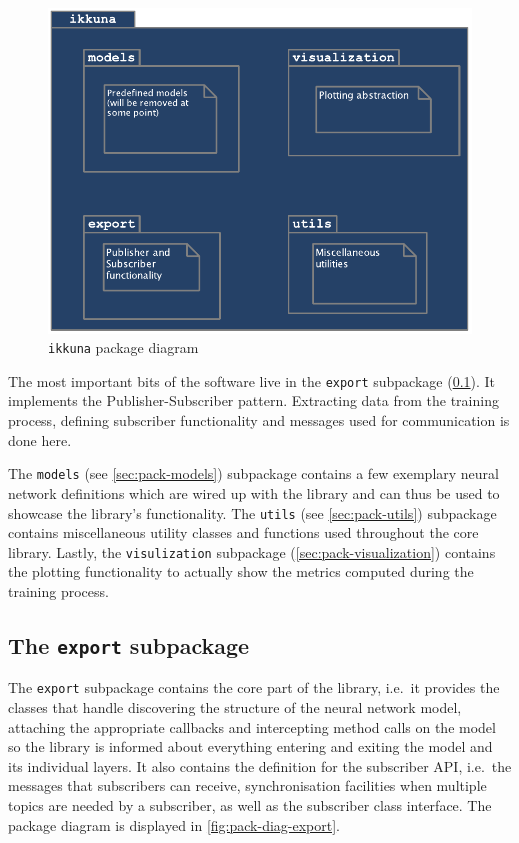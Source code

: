 \begin{figure}
    \hypertarget{fig:pack-diag-ikkuna}{%
        \centering
        \includegraphics[max width=.7\textwidth]{gfx/diagrams/class_diagrams/ikkuna_package_diagram.pdf}
        \caption{\texttt{ikkuna} package diagram}\label{fig:pack-diag-ikkuna}
    }
\end{figure}

The most important bits of the software live in the
\texttt{export} subpackage (\cref{sec:pack-export}). It
implements the Publisher-Subscriber pattern. Extracting data from the
training process, defining subscriber functionality and messages used
for communication is done here.

The \texttt{models} (see \cref{sec:pack-models}) subpackage contains a few
exemplary neural network definitions which are wired up with the library and can
thus be used to showcase the library's functionality. The \texttt{utils} (see
\cref{sec:pack-utils}) subpackage contains miscellaneous utility classes and
functions used throughout the core library. Lastly, the \texttt{visulization}
subpackage (\cref{sec:pack-visualization}) contains the plotting functionality
to actually show the metrics computed during the training process.

\hypertarget{sec:pack-export}{%
\subsection{The \texttt{export} subpackage}\label{sec:pack-export}}

The \texttt{export} subpackage contains the core part
of the library, i.e.~it provides the classes that handle discovering the
structure of the neural network model, attaching the appropriate
callbacks and intercepting method calls on the model so the library is
informed about everything entering and exiting the model and its
individual layers. It also contains the definition for the subscriber
API, i.e.~the messages that subscribers can receive, synchronisation
facilities when multiple topics are needed by a subscriber, as well as
the subscriber class interface. The package diagram is displayed in
\cref{fig:pack-diag-export}.

